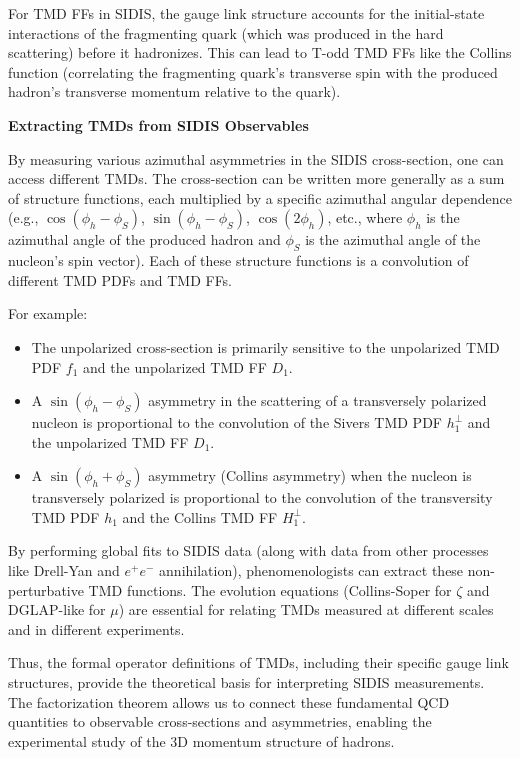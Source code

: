 \documentclass[11pt]{article}
\begin{document}
For TMD FFs in SIDIS, the gauge link structure accounts for the initial-state interactions of the fragmenting quark (which was produced in the hard
scattering) before it hadronizes. This can lead to T-odd TMD FFs like the Collins function (correlating the fragmenting quark's transverse spin with
the produced hadron's transverse momentum relative to the quark).

\textbf{Extracting TMDs from SIDIS Observables}

By measuring various azimuthal asymmetries in the SIDIS cross-section, one can access different TMDs. The cross-section can be written more generally
as a sum of structure functions, each multiplied by a specific azimuthal angular dependence (e.g., $\cos(\phi_h - \phi_S)$, $\sin(\phi_h - \phi_S)$,
$\cos(2\phi_h)$, etc., where $\phi_h$ is the azimuthal angle of the produced hadron and $\phi_S$ is the azimuthal angle of the nucleon's spin
vector). Each of these structure functions is a convolution of different TMD PDFs and TMD FFs.

For example:
\begin{itemize}
  \item The unpolarized cross-section is primarily sensitive to the unpolarized TMD PDF $f_1$ and the unpolarized TMD FF $D_1$.
  \item A $\sin(\phi_h - \phi_S)$ asymmetry in the scattering of a transversely polarized nucleon is proportional to the convolution of the Sivers TMD PDF
        $h_1^{\perp}$ and the unpolarized TMD FF $D_1$.
  \item A $\sin(\phi_h + \phi_S)$ asymmetry (Collins asymmetry) when the nucleon is transversely polarized is proportional to the convolution of the
        transversity TMD PDF $h_1$ and the Collins TMD FF $H_1^{\perp}$.
\end{itemize}

By performing global fits to SIDIS data (along with data from other processes like Drell-Yan and $e^+e^-$ annihilation), phenomenologists can extract
these non-perturbative TMD functions. The evolution equations (Collins-Soper for $\zeta$ and DGLAP-like for $\mu$) are essential for relating TMDs
measured at different scales and in different experiments.

Thus, the formal operator definitions of TMDs, including their specific gauge link structures, provide the theoretical basis for interpreting SIDIS
measurements. The factorization theorem allows us to connect these fundamental QCD quantities to observable cross-sections and asymmetries, enabling
the experimental study of the 3D momentum structure of hadrons.
\end{document}
